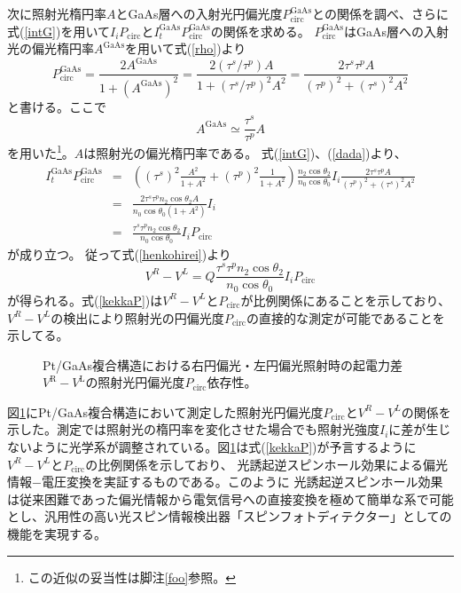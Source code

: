 次に照射光楕円率$A$とGaAs層への入射光円偏光度$P_\text{circ}^\text{GaAs}$との関係を調べ、さらに式(\ref{intG})を用いて$I_i P_\text{circ}$と$I_t^\text{GaAs}P_\text{circ}^\text{GaAs}$の関係を求める。
$P_\text{circ}^\text{GaAs}$はGaAs層への入射光の偏光楕円率$A^\text{GaAs}$を用いて式(\ref{rho})より
\begin{equation}
P^\text{GaAs}_\text{circ}=\frac{2A^\text{GaAs}}{1+({A^\text{GaAs}})^2}
=\frac{2(\tau^s/\tau^p)A}{1+(\tau^s/\tau^p)^2 A^2}
=\frac{2\tau^s \tau^p A}{({\tau^p})^{2}+({\tau^s})^{2} A^2}\label{dada}
\end{equation}
と書ける。ここで
\begin{equation}
A^\text{GaAs}\simeq \frac{\tau^s}{\tau^p}A
\end{equation}
を用いた\footnote{この近似の妥当性は脚注\ref{foo}参照。}。$A$は照射光の偏光楕円率である。
式(\ref{intG})、(\ref{dada})より、
\begin{eqnarray}
I_t^\text{GaAs}P_\text{circ}^\text{GaAs}&=&\left( ({\tau^s})^2\frac{A^2}{1+A^2}+({\tau^p})^2\frac{1}{1+A^2}\right) \frac{n_2\cos\theta_2}{n_0\cos\theta_0}I_i \frac{2\tau^s \tau^p A}{({\tau^p})^{2}+({\tau^s})^{2} A^2}\nonumber\\
&=&\frac{2\tau^s \tau^p n_2\cos\theta_2 A}{n_0 \cos\theta_0(1+A^2)}I_i\nonumber\\
&=&\frac{\tau^s \tau^p n_2\cos\theta_2 }{n_0 \cos\theta_0}I_i P_\text{circ}
\end{eqnarray}
が成り立つ。
従って式(\ref{henkohirei})より
\begin{equation}
V^R-V^L=  Q \frac{\tau^s \tau^p n_2\cos\theta_2 }{n_0 \cos\theta_0}I_i P_\text{circ}\label{kekkaP}
\end{equation}
が得られる。式(\ref{kekkaP})は$V^R-V^L$と$P_\text{circ}$が比例関係にあることを示しており、
$V^R-V^L$の検出により照射光の円偏光度$P_\text{circ}$の直接的な測定が可能であることを示してる。





\begin{figure}[t]
\begin{center}
\caption{Pt/GaAs複合構造における右円偏光・左円偏光照射時の起電力差$V^\text{R}-V^\text{L}$の照射光円偏光度$P_\text{circ}$依存性。}
\label{incident} 
\end{center}
\end{figure}


図\ref{incident}にPt/GaAs複合構造において測定した照射光円偏光度$P_\text{circ}$と$V^R-V^L$の関係を示した。測定では照射光の楕円率を変化させた場合でも照射光強度$I_i$に差が生じないように光学系が調整されている。図\ref{incident}は式(\ref{kekkaP})が予言するように$V^R-V^L$と$P_\text{circ}$の比例関係を示しており、
光誘起逆スピンホール効果による偏光情報−電圧変換を実証するものである。このように
光誘起逆スピンホール効果は従来困難であった偏光情報から電気信号への直接変換を極めて簡単な系で可能とし、汎用性の高い光スピン情報検出器「スピンフォトディテクター」としての機能を実現する。













